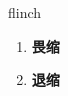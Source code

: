 
\begin{frame}
{\huge flinch}
\begin{center}
\begin{enumerate}\Large
  \item \textbf{畏缩}
  \item \textbf{退缩}
\end{enumerate}
\end{center}
\end{frame}
